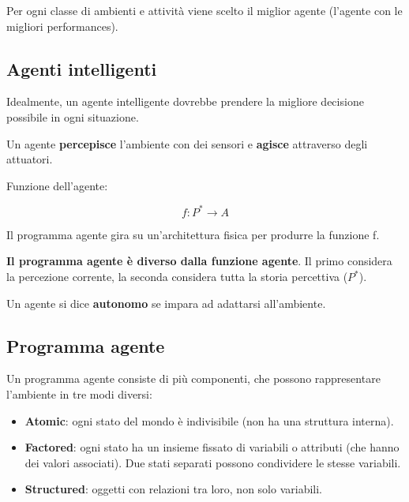 Per ogni classe di ambienti e attività viene scelto il miglior agente (l'agente
con le migliori performances).

\subsection{Agenti intelligenti}

Idealmente, un agente intelligente dovrebbe prendere la migliore decisione
possibile in ogni situazione.

Un agente \textbf{percepisce} l'ambiente con dei sensori e \textbf{agisce}
attraverso degli attuatori.

Funzione dell'agente:

\begin{equation}
f: P^* \rightarrow A
\end{equation}

Il programma agente gira su un'architettura fisica per produrre la funzione f.

\textbf{Il programma agente è diverso dalla funzione agente}.
Il primo considera la percezione corrente, la seconda considera tutta la
storia percettiva ($P^*$).

Un agente si dice \textbf{autonomo} se impara ad adattarsi all'ambiente.

\subsection{Programma agente}

Un programma agente consiste di più componenti, che possono rappresentare
l'ambiente in tre modi diversi:

\begin{itemize}
 \item \textbf{Atomic}: ogni stato del mondo è indivisibile (non ha una
struttura interna).
 \item \textbf{Factored}: ogni stato ha un insieme fissato di variabili o
attributi (che hanno dei valori associati).
Due stati separati possono condividere le stesse variabili.
 \item \textbf{Structured}: oggetti con relazioni tra loro, non solo
variabili.
\end{itemize}
